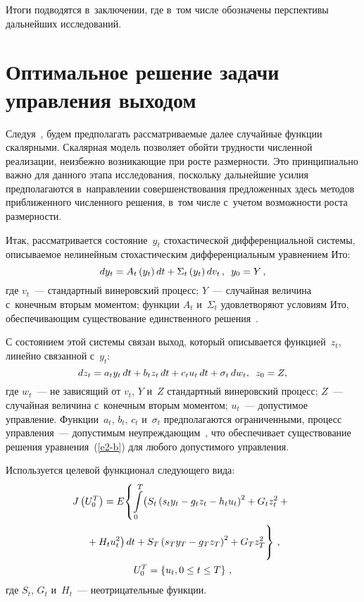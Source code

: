 \begin{multicols}{2}
Итоги 
подводятся в~заключении, где в~том числе обозначены перспективы 
дальнейших исследований.

\section{Оптимальное решение задачи управления выходом}

     Следуя~\cite{1-b}, будем предполагать рас\-смат\-ри\-ва\-емые далее 
случайные функции скалярными. Скалярная модель позволяет обойти 
трудности численной реализации, неизбежно возникающие при рос\-те 
размерности. Это принципиально важно для данного этапа исследования, 
поскольку дальнейшие усилия предполагаются в~направлении 
совершенствования предложенных здесь методов приближенного численного 
решения, в~том числе с~учетом возможности роста размерности.
     
     Итак, рассматривается состояние~$y_t$ стохастической 
дифференциальной системы, описываемое нелинейным стохастическим 
дифференциальным уравнением Ито:
     \begin{equation*}
     dy_t=A_t\left( y_t\right) dt+\Sigma_t \left( y_t\right) dv_t\,,\enskip y_0=Y\,,
     \end{equation*}
где $v_t$~--- стандартный винеровский процесс; $Y$~--- случайная величина 
с~конечным вторым моментом; функции $A_t$ и~$\Sigma_t$ удовлетворяют 
условиям Ито, обеспечивающим существование единственного 
решения~\cite{2-b}.

     С состоянием этой системы связан выход, который описывается 
функцией~$z_t$, линейно связанной с~$y_t$:
     \begin{equation}
     dz_t=a_t y_t\,dt+b_t z_t \,dt+c_t u_t \,dt+\sigma_t \,dw_t,\enskip z_0=Z,
     \label{e2-b}
     \end{equation}
где $w_t$~--- не зависящий от $v_t$, $Y$ и~$Z$ стандартный винеровский 
процесс; $Z$~--- случайная величина с~конечным вторым моментом; $u_t$~--- 
допустимое управ\-ле\-ние. Функции~$a_t$, $b_t$, $c_t$ и~$\sigma_t$ 
предполагаются ограниченными, процесс управления~--- допустимым 
неупреждающим~\cite{2-b}, что обеспечивает существование решения 
уравнения~(\ref{e2-b}) для любого допустимого управления.
     
     Используется целевой функционал следующего вида:
     \begin{multline*}
     \!J\left( U_0^T\right) =E\!\left\{ \int\limits_0^T\!\big( S_t\left( s_t y_t -g_t z_t-h_t 
u_t\right)^2+G_t z_t^2+{}\right.\\
\left.{}+H_t u_t^2\big)\,dt+
 S_T\left( s_T y_T-g_T z_T\right)^2+G_T z_T^2
      \vphantom{\int\limits_0^T}\right\}\,,\\
     U_0^T=\left\{ u_t, 0\leq t\leq T
     \right\}\,,
     \end{multline*}
где $S_t$, $G_t$ и~$H_t$~--- неотрицательные функции.


\end{multicols}

